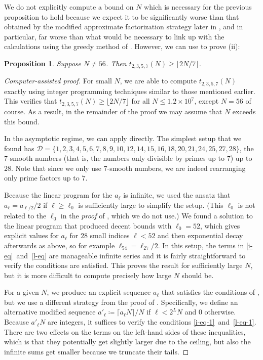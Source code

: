 \documentclass[10pt,a4paper,reqno]{amsart}
\numberwithin{equation}{section}
\theoremstyle{plain}
\newtheorem{proposition}[proposition]{Proposition}
\theoremstyle{definition}
\begin{document}
We do not explicitly compute a bound on $N$ which is necessary for the previous proposition to hold because we expect it to be significantly worse than that obtained by the modified approximate factorization strategy later in , and in particular, far worse than what would be necessary to link up with the calculations using the greedy method of .
However, we can use  to prove (ii):
\begin{proposition}\label{two-sevenths} Suppose $N\ne 56$.  Then $t_{2,3,5,7}(N) \ge \lfloor 2N/7\rfloor$.
\end{proposition}
\begin{proof}[Computer-assisted proof]
For small $N$, we are able to compute $t_{2,3,5,7}(N)$ exactly using integer programming techniques similar to those mentioned earlier.
This verifies that $t_{2,3,5,7}(N)\ge \lfloor 2N/7\rfloor$ for all $N\le 1.2\times 10^7$, except $N=56$ of course.
As a result, in the remainder of the proof we may assume that $N$ exceeds this bound.

In the asymptotic regime, we can apply  directly.
The simplest setup that we found has $\mathcal{D}=\{1,2,3,4,5,6,7,8,9,10,12,14,15,16,18,20,21,24,25,27,28\}$, the $7$-smooth numbers (that is, the numbers only divisible by primes up to $7$) up to $28$.
Note that since we only use $7$-smooth numbers, we are indeed rearranging only prime factors up to $7$.

Because the linear program for the $a_\ell$ is infinite, we used the ansatz that $a_\ell = a_{\ell/2}/2$ if $\ell\ge \ell_0$ is sufficiently large to simplify the setup.
(This $\ell_0$ is not related to the $\ell_0$ in the \emph{proof} of , which we do not use.)
We found a solution to the linear program that produced decent bounds with $\ell_0 = 52$, which gives explicit values for $a_\ell$ for $28$ small indices $\ell<52$ and then exponential decay afterwards as above, so for example $\ell_{54}=\ell_{27}/2$.
In this setup, the terms in \eqref{i-eq}~and~\eqref{l-eq} are manageable infinite series and it is fairly straightforward to verify the conditions are satisfied.
This proves the result for sufficiently large $N$, but it is more difficult to compute precisely how large $N$ should be.

For a given $N$, we produce an explicit sequence $a_\ell$ that satisfies the conditions of , but we use a different strategy from the proof of .
Specifically, we define an alternative modified sequence $ a'_\ell \coloneqq \lceil a_\ell N \rceil/N$ if $\ell < 2^L N$ and $0$ otherwise.
Because $a'_\ell N$ are integers, it suffices to verify the conditions \eqref{i-eq-1}~and~\eqref{l-eq-1}.
There are two effects on the terms on the left-hand sides of these inequalities, which is that they potentially get slightly larger due to the ceiling, but also the infinite sums get smaller because we truncate their tails.


\end{proof}
\end{document}
